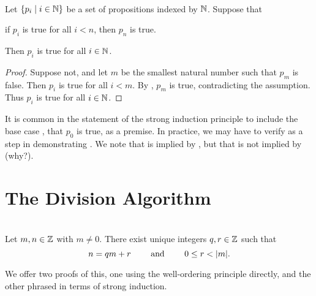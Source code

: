 \documentclass{amsart}
\begin{document}
\begin{Prop}  \\
Let $\{ p_i \mid i \in \mathbb{N} \}$ be a set of propositions indexed by
$\mathbb{N}$. Suppose that
\begin{itemize}
 if $p_i$ is true for all $i < n$, then $p_{n}$ is true.
\end{itemize}
Then $p_i$ is true for all $i \in \mathbb{N}$.
\end{Prop}

\begin{proof}
Suppose not, and let $m$ be the smallest natural number such that $p_m$ is false.
Then $p_i$ is true for all $i < m$. By
, $p_m$ is true, contradicting the assumption. Thus $p_i$
is true for all $i \in \mathbb{N}$.
\end{proof}

It is common in the statement of the strong induction principle to
include the base case , that $p_0$ is true, as a premise.
In practice, we may have to verify  as a step in demonstrating .
We note that  is implied by , but that 
is not implied by  (why?).

\newpage

\section{The Division Algorithm}

\begin{Prop}
 \\
Let $m,n \in \mathbb{Z}$ with $m \ne 0$. There exist unique integers $q,r
\in \mathbb{Z}$ such that
\[ n = qm + r \qquad \text{ and } \qquad 0 \le r < |m| . \]
\end{Prop}

We offer two proofs of this, one using the well-ordering principle
directly, and the other phrased in terms of strong induction.
\end{document}
